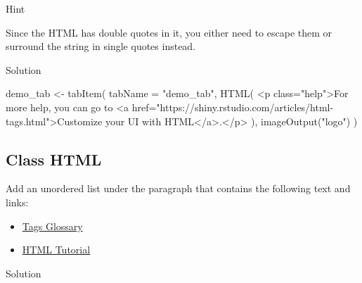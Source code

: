 \documentclass[
  oneside]{book}
\newenvironment{Shaded}{\begin{snugshade}}{\end{snugshade}}
\newcommand{\AttributeTok}[1]{\textcolor[rgb]{0.77,0.63,0.00}{#1}}
\newcommand{\FunctionTok}[1]{\textcolor[rgb]{0.00,0.00,0.00}{#1}}
\newcommand{\NormalTok}[1]{#1}
\newcommand{\OtherTok}[1]{\textcolor[rgb]{0.56,0.35,0.01}{#1}}
\newcommand{\SpecialCharTok}[1]{\textcolor[rgb]{0.00,0.00,0.00}{#1}}
\newcommand{\StringTok}[1]{\textcolor[rgb]{0.31,0.60,0.02}{#1}}
\providecommand{\tightlist}{%
  \setlength{\itemsep}{0pt}\setlength{\parskip}{0pt}}
\begin{document}
Hint

Since the HTML has double quotes in it, you either need to escape them or surround the string in single quotes instead.

Solution

\begin{Shaded}
\begin{Highlighting}[]
\NormalTok{demo\_tab }\OtherTok{\textless{}{-}} \FunctionTok{tabItem}\NormalTok{(}
  \AttributeTok{tabName =} \StringTok{"demo\_tab"}\NormalTok{,}
  \FunctionTok{HTML}\NormalTok{(}
    \StringTok{\textquotesingle{}\textless{}p class="help"\textgreater{}For more help, you can go to \textless{}a href="https://shiny.rstudio.com/articles/html{-}tags.html"\textgreater{}Customize your UI with HTML\textless{}/a\textgreater{}.\textless{}/p\textgreater{}\textquotesingle{}}
\NormalTok{  ),}
  \FunctionTok{imageOutput}\NormalTok{(}\StringTok{"logo"}\NormalTok{)}
\NormalTok{)}
\end{Highlighting}
\end{Shaded}

\hypertarget{class-html}{%
\subsection{Class HTML}\label{class-html}}

Add an unordered list under the paragraph that contains the following text and links:

\begin{itemize}
\tightlist
\item
  \href{https://shiny.rstudio.com/articles/tag-glossary.html}{Tags Glossary}
\item
  \href{https://www.w3schools.com/html/}{HTML Tutorial}
\end{itemize}

Solution

\begin{Shaded}
\end{Shaded}
\end{document}
